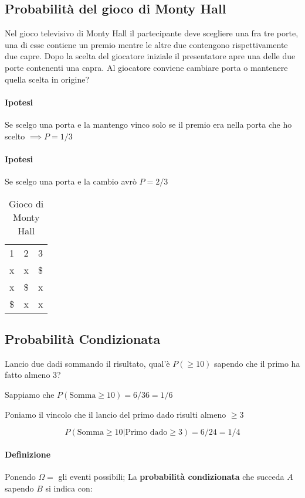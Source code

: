 \subsection{Probabilità del gioco di Monty Hall}
Nel gioco televisivo di Monty Hall il partecipante deve scegliere una fra tre porte, una di esse contiene un premio mentre le altre due contengono rispettivamente due capre. Dopo la scelta del giocatore iniziale il presentatore apre una delle due porte contenenti una capra. Al giocatore conviene cambiare porta o mantenere quella scelta in origine?

\paragraph{Ipotesi} Se scelgo una porta e la mantengo vinco solo se il premio era nella porta che ho scelto $ \implies P = 1/3 $

\paragraph{Ipotesi} Se scelgo una porta e la cambio avrò $ P = 2/3 $

\clearpage


\begin{table}[]
	\caption{Gioco di Monty Hall}
	\begin{tabular}{lll}
		1  & 2  & 3  \\
		x  & x  & \$ \\
		x  & \$ & x  \\
		\$ & x  & x 
	\end{tabular}
\end{table}


\subsection{Probabilità Condizionata}
Lancio due dadi sommando il risultato, qual'è $ P(\geq 10) $ sapendo che il primo ha fatto almeno 3?

Sappiamo che $ P(\text{Somma} \geq 10) = 6/36 = 1/6 $

Poniamo il vincolo che il lancio del primo dado risulti almeno $ \geq 3 $

\[ P(\text{Somma} \geq 10 | \text{Primo dado} \geq 3) = 6/24 = 1/4\]

\paragraph{Definizione}
Ponendo $ \Omega = $ gli eventi possibili;
La \textbf{probabilità condizionata} che succeda $ A $ sapendo $ B $ si indica con:

